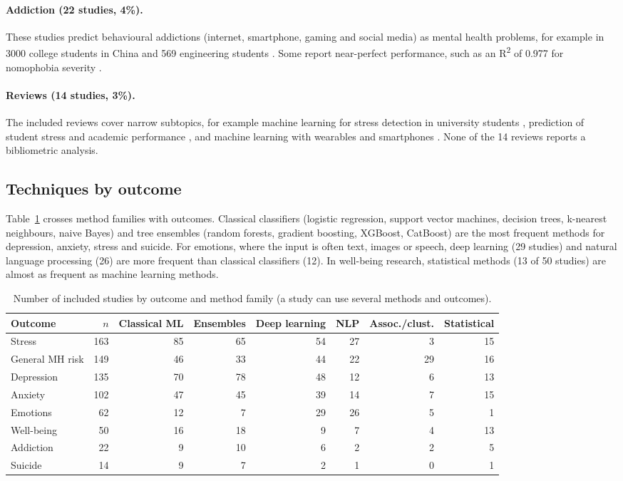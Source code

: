 \documentclass[11pt,a4paper]{article}
\begin{document}
\paragraph{Addiction (22 studies, 4\%).} These studies predict behavioural addictions (internet, smartphone, gaming and social media) as mental health problems, for example in 3000 college students in China \cite{D063} and 569 engineering students \cite{I665}. Some report near-perfect performance, such as an R\textsuperscript{2} of 0.977 for nomophobia severity \cite{I344}.

\paragraph{Reviews (14 studies, 3\%).} The included reviews cover narrow subtopics, for example machine learning for stress detection in university students \cite{I192}, prediction of student stress and academic performance \cite{I501}, and machine learning with wearables and smartphones \cite{S049}. None of the 14 reviews reports a bibliometric analysis.

\subsection{Techniques by outcome}

Table~\ref{tab:methods} crosses method families with outcomes. Classical classifiers (logistic regression, support vector machines, decision trees, k-nearest neighbours, naive Bayes) and tree ensembles (random forests, gradient boosting, XGBoost, CatBoost) are the most frequent methods for depression, anxiety, stress and suicide. For emotions, where the input is often text, images or speech, deep learning (29 studies) and natural language processing (26) are more frequent than classical classifiers (12). In well-being research, statistical methods (13 of 50 studies) are almost as frequent as machine learning methods.

\begin{table}[htbp]
\centering
\caption{Number of included studies by outcome and method family (a study can use several methods and outcomes).}
\label{tab:methods}
\small
\setlength{\tabcolsep}{4pt}
\begin{tabular}{lrrrrrrr}
\toprule
Outcome & $n$ & Classical ML & Ensembles & Deep learning & NLP & Assoc./clust. & Statistical \\
\midrule
Stress & 163 & 85 & 65 & 54 & 27 & 3 & 15 \\
General MH risk & 149 & 46 & 33 & 44 & 22 & 29 & 16 \\
Depression & 135 & 70 & 78 & 48 & 12 & 6 & 13 \\
Anxiety & 102 & 47 & 45 & 39 & 14 & 7 & 15 \\
Emotions & 62 & 12 & 7 & 29 & 26 & 5 & 1 \\
Well-being & 50 & 16 & 18 & 9 & 7 & 4 & 13 \\
Addiction & 22 & 9 & 10 & 6 & 2 & 2 & 5 \\
Suicide & 14 & 9 & 7 & 2 & 1 & 0 & 1 \\
\bottomrule
\end{tabular}
\end{table}
\end{document}
